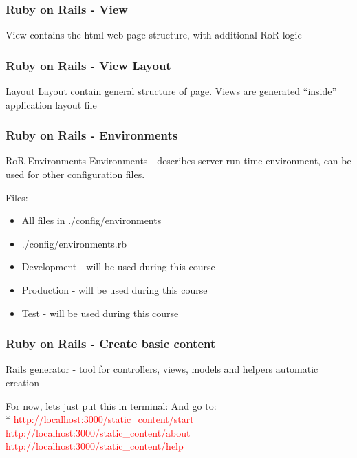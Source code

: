 \documentclass{beamer}
\theoremstyle{mystyle}
\begin{document}
\begin{frame}
  \frametitle{Ruby on Rails - View}
  \begin{definition}
    View contains the html web page structure, with additional RoR logic
  \end{definition}
  \begin{example}
    \viewexample
  \end{example}
\end{frame}

\begin{frame}
  \frametitle{Ruby on Rails - View Layout}
  \begin{definition}{Layout}
    Layout contain general structure of page. 
    Views are generated ``inside'' application layout file
  \end{definition}
  \begin{example}
    \viewexample
  \end{example}
\end{frame}

\begin{frame}
  \frametitle{Ruby on Rails - Environments}
  \begin{definition}{RoR Environments}
      Environments - describes server run time environment, can be used for other
      configuration files.
  \end{definition}
  Files:
  \begin{itemize}
  \item All files in ./config/environments
  \item ./config/environments.rb
  \end{itemize}
  \begin{example}
    \begin{itemize}
    \item Development - will be used during this course
    \item Production - will be used during this course
    \item Test - will be used during this course
    \end{itemize}
  \end{example}
  
\end{frame}

\begin{frame}
  \frametitle{Ruby on Rails - Create basic content}
  \begin{definition}
    Rails generator - tool for controllers, views, models and helpers automatic creation
  \end{definition}
  For now, lets just put this in terminal:
  \railsgenerator
  And go to:\\*
  \textcolor{red}{http://localhost:3000/static\_content/start}
  \textcolor{red}{http://localhost:3000/static\_content/about}
  \textcolor{red}{http://localhost:3000/static\_content/help}
  
\end{frame}
\end{document}
